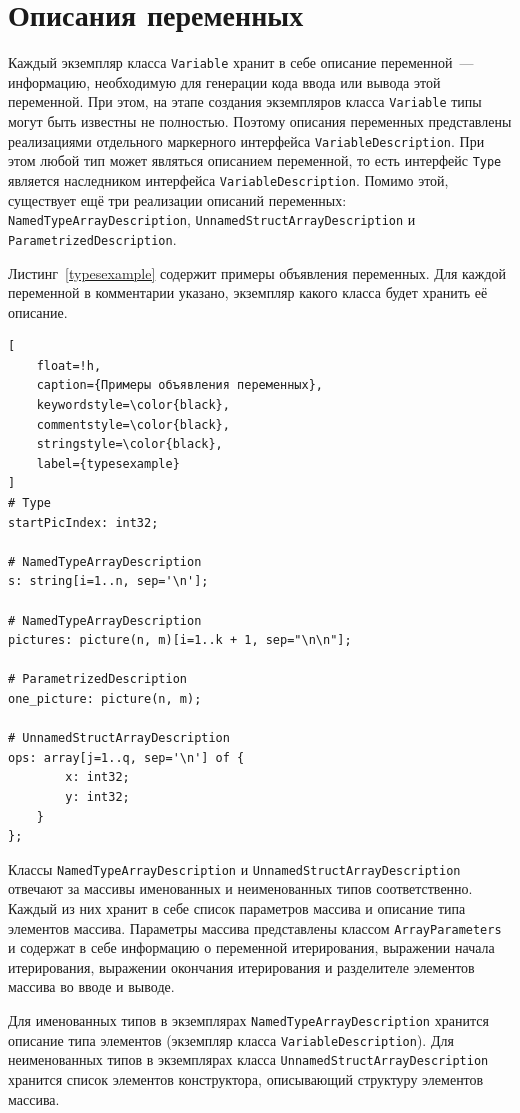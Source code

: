 \documentclass[times,specification,annotation]{style/itmo-student-thesis/itmo-student-thesis}
\begin{document}
\section{Описания переменных}

Каждый экземпляр класса \texttt{Variable} хранит в себе описание переменной~--- информацию, необходимую для генерации кода ввода или вывода этой переменной. При этом, на этапе создания экземпляров класса \texttt{Variable} типы могут быть известны не полностью. Поэтому описания переменных представлены реализациями отдельного маркерного интерфейса \texttt{VariableDescription}. При этом любой тип может являться описанием переменной, то есть интерфейс \texttt{Type} является наследником интерфейса \texttt{VariableDescription}. Помимо этой, существует ещё три реализации описаний переменных: \texttt{NamedTypeArrayDescription}, \texttt{UnnamedStructArrayDescription} и \texttt{ParametrizedDescription}.

Листинг~\ref{typesexample} содержит примеры объявления переменных. Для каждой переменной в комментарии указано, экземпляр какого класса будет хранить её описание.

\begin{lstlisting}[
    float=!h,
    caption={Примеры объявления переменных},
    keywordstyle=\color{black},
    commentstyle=\color{black},
    stringstyle=\color{black},
    label={typesexample}
]
# Type
startPicIndex: int32; 

# NamedTypeArrayDescription
s: string[i=1..n, sep='\n']; 

# NamedTypeArrayDescription
pictures: picture(n, m)[i=1..k + 1, sep="\n\n"]; 

# ParametrizedDescription
one_picture: picture(n, m); 

# UnnamedStructArrayDescription
ops: array[j=1..q, sep='\n'] of { 
        x: int32;
        y: int32;
    }
};
\end{lstlisting}

Классы \texttt{NamedTypeArrayDescription} и \texttt{UnnamedStructArrayDescription} отвечают за массивы именованных и неименованных типов соответственно. Каждый из них хранит в себе список параметров массива и описание типа элементов массива. Параметры массива представлены классом \texttt{ArrayParameters} и содержат в себе информацию о переменной итерирования, выражении начала итерирования, выражении окончания итерирования и разделителе элементов массива во вводе и выводе.

Для именованных типов в экземплярах \texttt{NamedTypeArrayDescription} хранится описание типа элементов (экземпляр класса \texttt{VariableDescription}). Для неименованных типов в экземплярах класса \texttt{UnnamedStructArrayDescription} хранится список элементов конструктора, описывающий структуру элементов массива.
\end{document}
